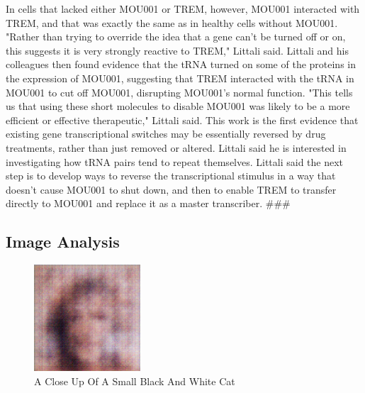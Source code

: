 \documentclass{article}%
\begin{document}
In cells that lacked either MOU001 or TREM, however, MOU001 interacted with TREM, and that was exactly the same as in healthy cells without MOU001.\newline%
"Rather than trying to override the idea that a gene can't be turned off or on, this suggests it is very strongly reactive to TREM," Littali said.\newline%
Littali and his colleagues then found evidence that the tRNA turned on some of the proteins in the expression of MOU001, suggesting that TREM interacted with the tRNA in MOU001 to cut off MOU001, disrupting MOU001's normal function.\newline%
"This tells us that using these short molecules to disable MOU001 was likely to be a more efficient or effective therapeutic," Littali said.\newline%
This work is the first evidence that existing gene transcriptional switches may be essentially reversed by drug treatments, rather than just removed or altered. Littali said he is interested in investigating how tRNA pairs tend to repeat themselves.\newline%
Littali said the next step is to develop ways to reverse the transcriptional stimulus in a way that doesn't cause MOU001 to shut down, and then to enable TREM to transfer directly to MOU001 and replace it as a master transcriber.\newline%
\#\#\#

%
\subsection{Image Analysis}%
\label{subsec:ImageAnalysis}%


\begin{figure}[h!]%
\centering%
\includegraphics[width=150px]{500_fake_images/samples_5_451.png}%
\caption{A Close Up Of A Small Black And White Cat}%
\end{figure}

%
\end{document}
